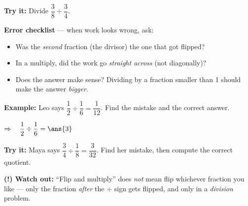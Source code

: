 \documentclass[12pt]{article}
\begin{document}
\begin{tryitbox}
\textbf{Try it:} \quad Divide $\dfrac{3}{8} \div \dfrac{3}{4}$.\\[2pt]
\end{tryitbox}


\begin{formulabox}
\textbf{Error checklist} --- when work looks wrong, ask:
\begin{itemize}[leftmargin=1.2cm, itemsep=1pt, topsep=2pt]
  \item Was the \emph{second} fraction (the divisor) the one that got flipped?
  \item In a multiply, did the work go \emph{straight across} (not diagonally)?
  \item Does the answer make sense? Dividing by a fraction smaller than 1
        should make the answer \emph{bigger}.
\end{itemize}
\end{formulabox}

\begin{examplebox}
\textbf{Example:} \quad Leo says $\dfrac{1}{2} \div \dfrac{1}{6} =
\dfrac{1}{12}$. Find the mistake and the correct answer.

$\Rightarrow\quad \dfrac{1}{2} \div \dfrac{1}{6} = \ans{3}$
\end{examplebox}

\begin{tryitbox}
\textbf{Try it:} \quad Maya says $\dfrac{3}{4} \div \dfrac{1}{8} =
\dfrac{3}{32}$. Find her mistake, then compute the correct quotient.\\[2pt]
\end{tryitbox}

\begin{watchoutbox}
\textbf{(!) Watch out:} ``Flip and multiply'' does \emph{not} mean flip
whichever fraction you like --- only the fraction \emph{after} the $\div$ sign
gets flipped, and only in a \emph{division} problem.
\end{watchoutbox}
\end{document}
